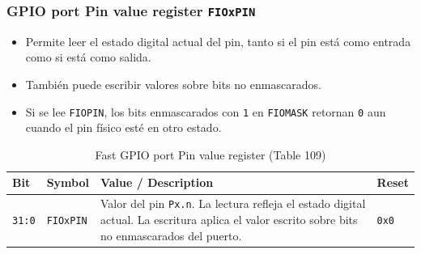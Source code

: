\subsubsection{GPIO port Pin value register \texttt{FIOxPIN}}
\begin{itemize}
  \item Permite leer el estado digital actual del pin, tanto si el pin está como entrada como si está como salida.
  \item También puede escribir valores sobre bits no enmascarados.
  \item Si se lee \texttt{FIOPIN}, los bits enmascarados con \texttt{1} en \texttt{FIOMASK} retornan \texttt{0} aun cuando el pin físico esté en otro estado.
\end{itemize}

\begin{table}[H]
  \centering
  \small
  \caption{Fast GPIO port Pin value register (Table 109)}
  \begin{tabularx}{0.96\textwidth}{|>{\centering\arraybackslash}p{}|>{\raggedright\arraybackslash}p{}|>{\raggedright\arraybackslash}X|>{\centering\arraybackslash}p{}|}
    \hline
    \textbf{Bit} & \textbf{Symbol} & \textbf{Value / Description} & \textbf{Reset} \\
    \hline
    \texttt{31:0} & \texttt{FIOxPIN} & Valor del pin \texttt{Px.n}. La lectura refleja el estado digital actual. La escritura aplica el valor escrito sobre bits no enmascarados del puerto. & \texttt{0x0} \\
    \hline
  \end{tabularx}
\end{table}

